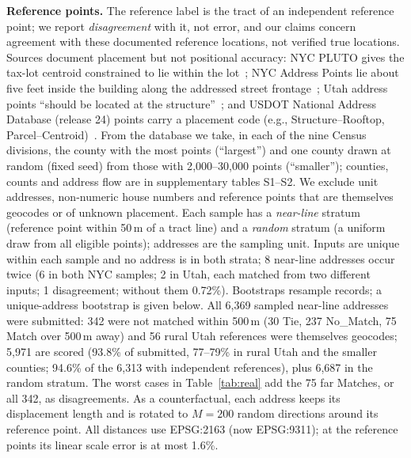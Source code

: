 \documentclass[runningheads]{llncs}
\begin{document}
{\sloppy\textbf{Reference points.} The reference label is the tract of an independent reference point; we report \emph{disagreement} with it, not error, and our claims concern agreement with these documented reference locations, not verified true locations. Sources document placement but not positional accuracy: NYC PLUTO gives the tax-lot centroid constrained to lie within the lot~\cite{pluto}; NYC Address Points lie about five feet inside the building along the addressed street frontage~\cite{nycap}; Utah address points ``should be located at the structure''~\cite{ugrc}; and USDOT National Address Database (release 24) points carry a placement code (e.g., Structure--Rooftop, Parcel--Centroid)~\cite{nad,nadschema}. From the database we take, in each of the nine Census divisions, the county with the most points (``largest'') and one county drawn at random (fixed seed) from those with 2{,}000--30{,}000 points (``smaller''); counties, counts and address flow are in supplementary tables S1--S2. We exclude unit addresses, non-numeric house numbers and reference points that are themselves geocodes or of unknown placement. Each sample has a \emph{near-line} stratum (reference point within 50\,m of a tract line) and a \emph{random} stratum (a uniform draw from all eligible points); addresses are the sampling unit. Inputs are unique within each sample and no address is in both strata; 8 near-line addresses occur twice (6 in both NYC samples; 2 in Utah, each matched from two different inputs; 1 disagreement; without them 0.72\%). Bootstraps resample records; a unique-address bootstrap is given below. All 6{,}369 sampled near-line addresses were submitted: 342 were not matched within 500\,m (30 Tie, 237 No\_Match, 75 Match over 500\,m away) and 56 rural Utah references were themselves geocodes; 5{,}971 are scored (93.8\% of submitted, 77--79\% in rural Utah and the smaller counties; 94.6\% of the 6{,}313 with independent references), plus 6{,}687 in the random stratum. The worst cases in Table~\ref{tab:real} add the 75 far Matches, or all 342, as disagreements. As a counterfactual, each address keeps its displacement length and is rotated to $M=200$ random directions around its reference point. All distances use EPSG:2163 (now EPSG:9311); at the reference points its linear scale error is at most 1.6\%.\par}
\end{document}
